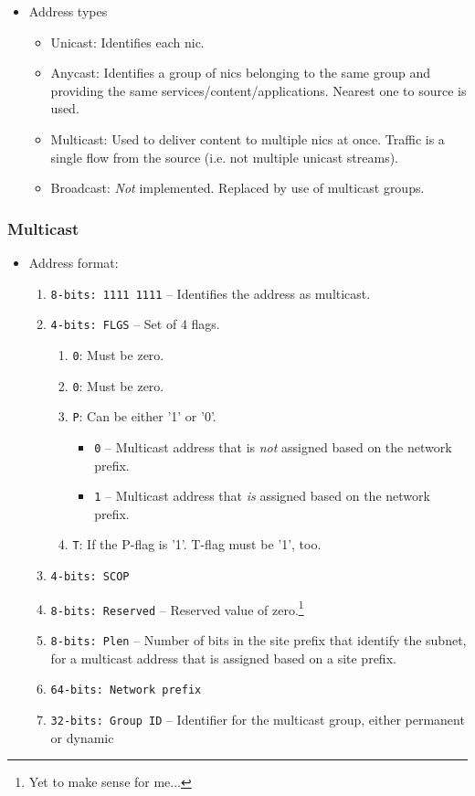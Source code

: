 \begin{itemize}
    \item Address types
    \begin{itemize}
        \item Unicast: Identifies each \gls{nic}.
        \item Anycast: Identifies a group of \glspl{nic} belonging to the same group and providing the same services/content/applications. Nearest one to source is used.
        \item Multicast: Used to deliver content to multiple \glspl{nic} at once. Traffic is a single flow from the source (i.e. not multiple unicast streams).
        \item Broadcast: \textit{Not} implemented. Replaced by use of multicast groups.
    \end{itemize}
\end{itemize}

\subsubsection{Multicast}

\begin{itemize}
    \item Address format:\cite{IPv6Addr96:online}
    \begin{enumerate}
        \item \texttt{8-bits: 1111 1111} -- Identifies the address as multicast.
        \item \texttt{4-bits: FLGS} -- Set of 4 flags.
        \begin{enumerate}
            \item \texttt{0}: Must be zero.
            \item \texttt{0}: Must be zero.
            \item \texttt{P}: Can be either '1' or '0'.
            \begin{itemize}
                \item \texttt{0} -- Multicast address that is \textit{not} assigned based on the network prefix.
                \item \texttt{1} -- Multicast address that \textit{is} assigned based on the network prefix.
            \end{itemize}
            \item \texttt{T}: If the P-flag is '1'. T-flag must be '1', too.
        \end{enumerate}
        \item \texttt{4-bits: SCOP}
        \item \texttt{8-bits: Reserved} -- Reserved value of zero.\footnote{Yet to make sense for me...}
        \item \texttt{8-bits: Plen} -- Number of bits in the site prefix that identify the subnet, for a multicast address that is assigned based on a site prefix.
        \item \texttt{64-bits: Network prefix}
        \item \texttt{32-bits: Group ID} -- Identifier for the multicast group, either permanent or dynamic
    \end{enumerate}
\end{itemize}

